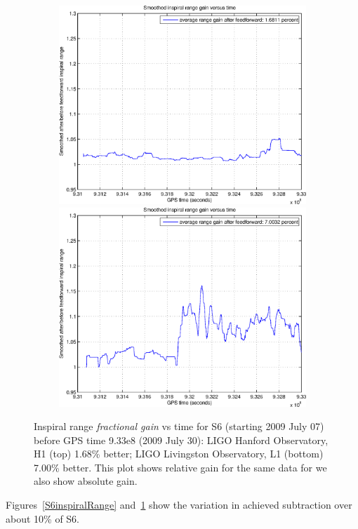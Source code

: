 \begin{figure}
\begin{center}
\includegraphics[height=75mm, width=150mm]{figure15a.eps}
\includegraphics[height=75mm, width=150mm]{figure15b.eps}
\caption{Inspiral range \textit{fractional gain} vs time for S6 (starting 2009 July 07) before GPS time 9.33e8 (2009 July 30):
LIGO Hanford Observatory, H1 (top) 1.68\% better; LIGO Livingston Observatory, L1 (bottom) 7.00\% better. This plot shows relative gain for the same data for we also show absolute gain.}
\label{S6inspiralRangeGain}
\end{center}
\end{figure}

Figures~\ref{S6inspiralRange} and~\ref{S6inspiralRangeGain} show the variation in achieved subtraction over about 10\% of S6.

